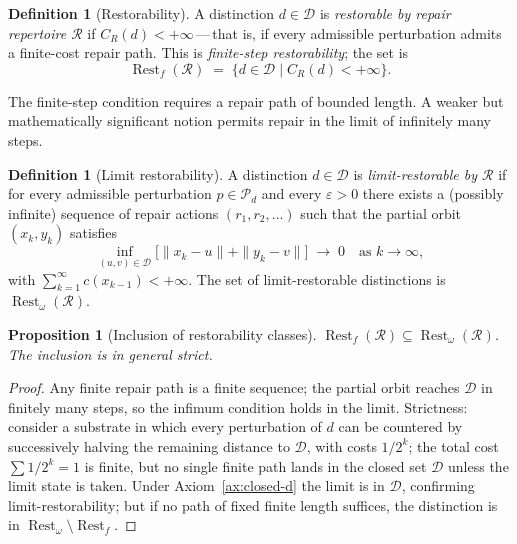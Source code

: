 \documentclass[12pt, oneside]{article}
\theoremstyle{plain}
\newtheorem{proposition}[theorem]{Proposition}
\theoremstyle{definition}
\newtheorem{definition}[theorem]{Definition}
\theoremstyle{remark}
\theoremstyle{definition}
\DeclareMathOperator{\Rest}{Rest}
\newcommand{\Restf}{\Rest_{f}}
\newcommand{\Reston}{\Rest_{\omega}}
\newcommand{\CR}{C_{\!R}}
\newcommand{\Psub}{\mathcal{P}}
\newcommand{\Dsub}{\mathcal{D}}
\begin{document}
\begin{definition}[Restorability]
  A distinction $d \in \Dsub$ is \emph{restorable by repair repertoire
  $\mathcal{R}$} if $\CR(d) < +\infty$\,---\,that is, if every
  admissible perturbation admits a finite-cost repair path.
  This is \emph{finite-step restorability}; the set is
  \[
    \Restf(\mathcal{R})
    \;=\;
    \bigl\{
      d \in \Dsub \;\big|\; \CR(d) < +\infty
    \bigr\}.
  \]
\end{definition}

The finite-step condition requires a repair path of bounded length.
A weaker but mathematically significant notion permits repair in the
limit of infinitely many steps.

\begin{definition}[Limit restorability]
  A distinction $d \in \Dsub$ is \emph{limit-restorable by
  $\mathcal{R}$} if for every admissible perturbation $p \in \Psub_d$
  and every $\varepsilon > 0$ there exists a (possibly infinite)
  sequence of repair actions $(r_1, r_2, \ldots)$ such that the
  partial orbit $(x_k, y_k)$ satisfies
  \[
    \inf_{(u,v) \in \Dsub}
    \bigl[\|x_k - u\| + \|y_k - v\|\bigr]
    \;\to\; 0
    \quad\text{as } k \to \infty,
  \]
  with $\sum_{k=1}^\infty c(x_{k-1}) < +\infty$.
  The set of limit-restorable distinctions is $\Reston(\mathcal{R})$.
\end{definition}

\begin{proposition}[Inclusion of restorability classes]
  $\Restf(\mathcal{R}) \subseteq \Reston(\mathcal{R})$.
  The inclusion is in general strict.
  \label{prop:class-inclusion}
\end{proposition}

\begin{proof}
  Any finite repair path is a finite sequence; the partial orbit
  reaches $\Dsub$ in finitely many steps, so the infimum condition
  holds in the limit.
  Strictness: consider a substrate in which every perturbation of $d$
  can be countered by successively halving the remaining distance to
  $\Dsub$, with costs $1/2^k$; the total cost $\sum 1/2^k = 1$ is
  finite, but no single finite path lands in the closed set $\Dsub$
  unless the limit state is taken.
  Under Axiom~\ref{ax:closed-d} the limit is in $\Dsub$, confirming
  limit-restorability; but if no path of fixed finite length suffices,
  the distinction is in $\Reston \setminus \Restf$.
\end{proof}
\end{document}

